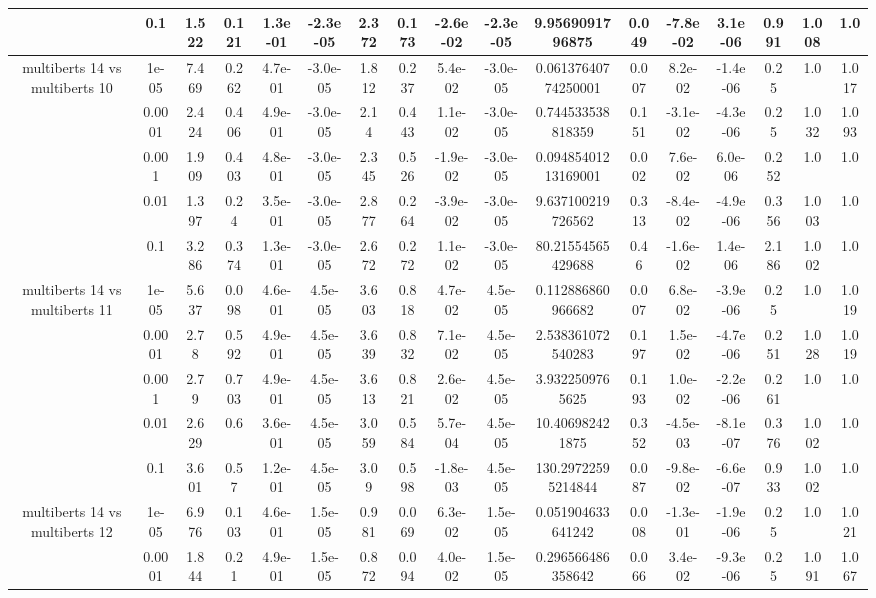 \begin{tabular}{|c|c|c|c|c|c|c|c|c|c|c|c|c|c|c|c|c|}
 & 0.1 & 1.522 & 0.121 & 1.3e-01 & -2.3e-05 & 2.372 & 0.173 & -2.6e-02 & -2.3e-05 & 9.9569091796875 & 0.049 & -7.8e-02 & 3.1e-06 & 0.991 & 1.008 & 1.0 \\
\hline
\multirow{5}{*}{multiberts 14 vs multiberts 10} & 1e-05 & 7.469 & 0.262 & 4.7e-01 & -3.0e-05 & 1.812 & 0.237 & 5.4e-02 & -3.0e-05 & 0.06137640774250001 & 0.007 & 8.2e-02 & -1.4e-06 & 0.25 & 1.0 & 1.017 \\
 & 0.0001 & 2.424 & 0.406 & 4.9e-01 & -3.0e-05 & 2.14 & 0.443 & 1.1e-02 & -3.0e-05 & 0.744533538818359 & 0.151 & -3.1e-02 & -4.3e-06 & 0.25 & 1.032 & 1.093 \\
 & 0.001 & 1.909 & 0.403 & 4.8e-01 & -3.0e-05 & 2.345 & 0.526 & -1.9e-02 & -3.0e-05 & 0.09485401213169001 & 0.002 & 7.6e-02 & 6.0e-06 & 0.252 & 1.0 & 1.0 \\
 & 0.01 & 1.397 & 0.24 & 3.5e-01 & -3.0e-05 & 2.877 & 0.264 & -3.9e-02 & -3.0e-05 & 9.637100219726562 & 0.313 & -8.4e-02 & -4.9e-06 & 0.356 & 1.003 & 1.0 \\
 & 0.1 & 3.286 & 0.374 & 1.3e-01 & -3.0e-05 & 2.672 & 0.272 & 1.1e-02 & -3.0e-05 & 80.21554565429688 & 0.46 & -1.6e-02 & 1.4e-06 & 2.186 & 1.002 & 1.0 \\
\hline
\multirow{5}{*}{multiberts 14 vs multiberts 11} & 1e-05 & 5.637 & 0.098 & 4.6e-01 & 4.5e-05 & 3.603 & 0.818 & 4.7e-02 & 4.5e-05 & 0.112886860966682 & 0.007 & 6.8e-02 & -3.9e-06 & 0.25 & 1.0 & 1.019 \\
 & 0.0001 & 2.78 & 0.592 & 4.9e-01 & 4.5e-05 & 3.639 & 0.832 & 7.1e-02 & 4.5e-05 & 2.538361072540283 & 0.197 & 1.5e-02 & -4.7e-06 & 0.251 & 1.028 & 1.019 \\
 & 0.001 & 2.79 & 0.703 & 4.9e-01 & 4.5e-05 & 3.613 & 0.821 & 2.6e-02 & 4.5e-05 & 3.9322509765625 & 0.193 & 1.0e-02 & -2.2e-06 & 0.261 & 1.0 & 1.0 \\
 & 0.01 & 2.629 & 0.6 & 3.6e-01 & 4.5e-05 & 3.059 & 0.584 & 5.7e-04 & 4.5e-05 & 10.406982421875 & 0.352 & -4.5e-03 & -8.1e-07 & 0.376 & 1.002 & 1.0 \\
 & 0.1 & 3.601 & 0.57 & 1.2e-01 & 4.5e-05 & 3.09 & 0.598 & -1.8e-03 & 4.5e-05 & 130.29722595214844 & 0.087 & -9.8e-02 & -6.6e-07 & 0.933 & 1.002 & 1.0 \\
\hline
\multirow{5}{*}{multiberts 14 vs multiberts 12} & 1e-05 & 6.976 & 0.103 & 4.6e-01 & 1.5e-05 & 0.981 & 0.069 & 6.3e-02 & 1.5e-05 & 0.051904633641242 & 0.008 & -1.3e-01 & -1.9e-06 & 0.25 & 1.0 & 1.021 \\
 & 0.0001 & 1.844 & 0.21 & 4.9e-01 & 1.5e-05 & 0.872 & 0.094 & 4.0e-02 & 1.5e-05 & 0.296566486358642 & 0.066 & 3.4e-02 & -9.3e-06 & 0.25 & 1.091 & 1.067 \\

\end{tabular}

